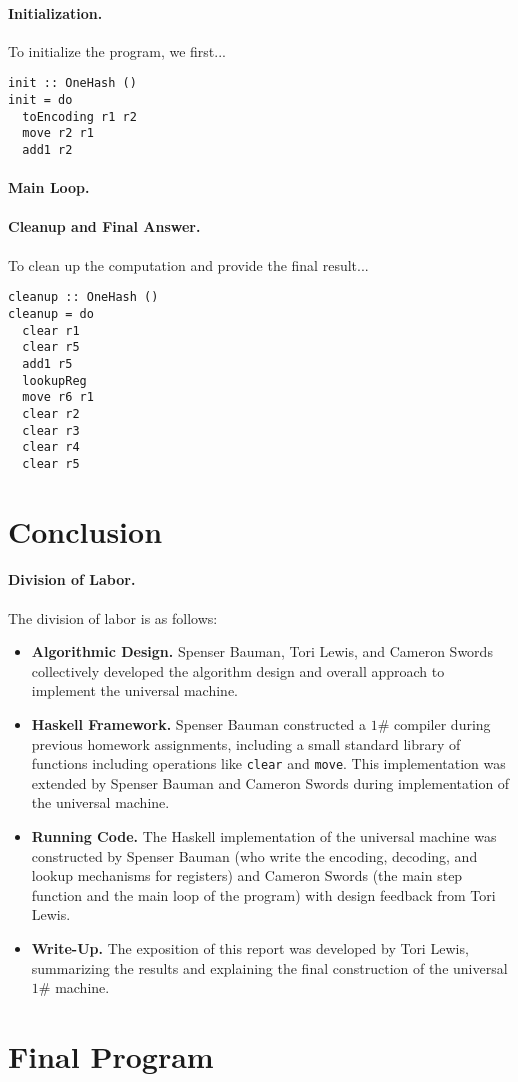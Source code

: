 \documentclass[10pt, preprint, nocopyrightspace]{sigplanconf}
\newcommand{\oh}{$1\#$\xspace}
\begin{document}
\paragraph{Initialization.}

To initialize the program, we first...

\begin{lstlisting}
init :: OneHash ()
init = do
  toEncoding r1 r2
  move r2 r1
  add1 r2
\end{lstlisting}

\paragraph{Main Loop.}

\paragraph{Cleanup and Final Answer.}

To clean up the computation and provide the final result...

\begin{lstlisting}
cleanup :: OneHash ()
cleanup = do
  clear r1
  clear r5
  add1 r5
  lookupReg
  move r6 r1
  clear r2
  clear r3
  clear r4
  clear r5
\end{lstlisting}

\section{Conclusion}

\paragraph{Division of Labor.} The division of labor is as follows:
\begin{itemize}
\item \textbf{Algorithmic Design.}
      Spenser Bauman, Tori Lewis, and Cameron Swords collectively developed the
      algorithm design and overall approach to implement the universal machine.
\item \textbf{Haskell Framework.}
      Spenser Bauman constructed a \oh compiler during previous homework
      assignments, including a small standard library of functions including
      operations like \lstinline{clear} and \lstinline{move}. This
      implementation was extended by Spenser Bauman and Cameron Swords during
      implementation of the universal machine.
\item \textbf{Running Code.}
      The Haskell implementation of the universal machine was constructed by
      Spenser Bauman (who write the encoding, decoding, and lookup mechanisms
      for registers) and Cameron Swords (the main step function and the main
      loop of the program) with design feedback from Tori Lewis.
\item \textbf{Write-Up.}
      The exposition of this report was developed by Tori Lewis, summarizing the
      results and explaining the final construction of the universal \oh
      machine.
\end{itemize}

\clearpage

\appendix

\section{Final Program}


\end{document}
